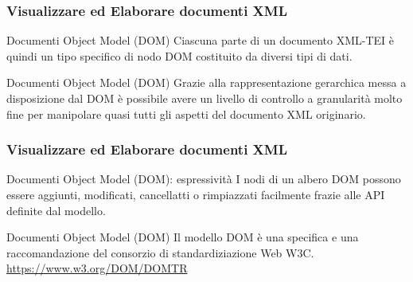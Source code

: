 \begin{frame}
    \frametitle{Visualizzare ed Elaborare documenti XML}
    \addtocounter{nframe}{1}
    

     \begin{block}{Documenti Object Model (DOM)}
        Ciascuna parte di un documento XML-TEI è quindi un tipo specifico di nodo DOM costituito da diversi tipi di dati.
     \end{block}

     \begin{block}{Documenti Object Model (DOM)}
        Grazie alla rappresentazione gerarchica messa a disposizione dal DOM è possibile avere un livello di controllo a granularità molto fine per manipolare quasi tutti gli aspetti del documento XML originario.
     \end{block}
     
\end{frame}

\begin{frame}
    \frametitle{Visualizzare ed Elaborare documenti XML}
    \addtocounter{nframe}{1}
    

     \begin{block}{Documenti Object Model (DOM): espressività}
       I nodi di un albero DOM possono essere aggiunti, modificati, cancellatti o rimpiazzati facilmente frazie alle API definite dal modello.
     \end{block}

     \begin{block}{Documenti Object Model (DOM)}
        Il modello DOM è una specifica e una raccomandazione del consorzio di standardiziazione Web W3C.
        \\\url{https://www.w3.org/DOM/DOMTR}
     \end{block}
     
\end{frame}

